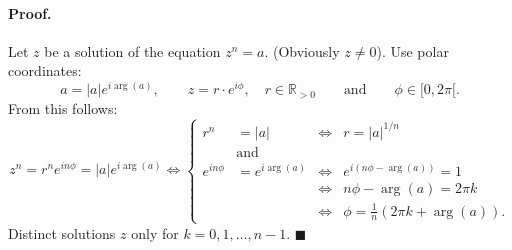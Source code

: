 \documentclass[12pt]{article}
\newcommand{\R}{\mathbb{R}}
\begin{document}
\paragraph*{Proof.} Let $z$ be a solution of the equation $z^n = a$. (Obviously $z \neq 0$). Use polar coordinates:
\[
a = |a|e^{i \arg(a)}, \qquad z = r \cdot e^{i\phi}, \quad r \in \R_{>0} \qquad \text{and} \qquad \phi \in [0, 2\pi[.
\]
From this follows:
\[
z^n = r^n e^{in\phi} = |a|e^{i \arg(a)} \iff
\left\{
\begin{aligned}
r^n &= |a| & \iff & r = |a|^{1/n} \\
&\text{and} & & \\
e^{in\phi} &= e^{i \arg(a)} & \iff & e^{i(n\phi - \arg(a))} = 1 \\
& & \iff & n\phi - \arg(a) = 2\pi k \\
& & \iff & \phi = \tfrac{1}{n}(2\pi k + \arg(a)).
\end{aligned}
\right.
\]
Distinct solutions $z$ only for $k = 0, 1, \dots, n-1$. \hfill $\blacksquare$
\end{document}

